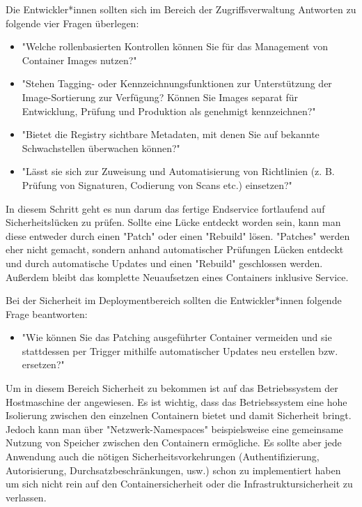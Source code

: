 Die Entwickler*innen sollten sich im Bereich der Zugriffsverwaltung Antworten zu folgende vier Fragen überlegen:

\begin{itemize}
    \item "Welche rollenbasierten Kontrollen können Sie für das Management von Container Images nutzen?" \cite{ContainerSecurity}
    \item "Stehen Tagging- oder Kennzeichnungsfunktionen zur Unterstützung der Image-Sortierung zur Verfügung? Können Sie Images separat für Entwicklung, Prüfung und Produktion als genehmigt kennzeichnen?" \cite{ContainerSecurity}
    \item "Bietet die Registry sichtbare Metadaten, mit denen Sie auf bekannte Schwachstellen überwachen können?" \cite{ContainerSecurity}
    \item "Lässt sie sich zur Zuweisung und Automatisierung von Richtlinien (z. B. Prüfung von Signaturen, Codierung von Scans etc.) einsetzen?" \cite{ContainerSecurity}
\end{itemize}


In diesem Schritt geht es nun darum das fertige Endservice fortlaufend auf Sicherheitslücken zu prüfen. Sollte eine Lücke entdeckt worden sein, kann man diese entweder durch einen "Patch" oder einen "Rebuild" lösen. "Patches" werden eher nicht gemacht, sondern anhand automatischer Prüfungen Lücken entdeckt und durch automatische Updates und einen "Rebuild" geschlossen werden. Außerdem bleibt das komplette Neuaufsetzen eines Containers inklusive Service. \cite{ContainerSecurity}

Bei der Sicherheit im Deploymentbereich sollten die Entwickler*innen folgende Frage beantworten:

\begin{itemize}
    \item "Wie können Sie das Patching ausgeführter Container vermeiden und sie stattdessen per Trigger mithilfe automatischer Updates neu erstellen bzw. ersetzen?" \cite{ContainerSecurity}
\end{itemize}


Um in diesem Bereich Sicherheit zu bekommen ist auf das Betriebssystem der Hostmaschine der angewiesen. Es ist wichtig, dass das Betriebssystem eine hohe Isolierung zwischen den einzelnen Containern bietet und damit Sicherheit bringt. Jedoch kann man über "Netzwerk-Namespaces" beispielsweise eine gemeinsame Nutzung von Speicher zwischen den Containern ermögliche. Es sollte aber jede Anwendung auch die nötigen Sicherheitsvorkehrungen (Authentifizierung, Autorisierung, Durchsatzbeschränkungen, usw.) schon zu implementiert haben um sich nicht rein auf den Containersicherheit oder die Infrastruktursicherheit zu verlassen.

